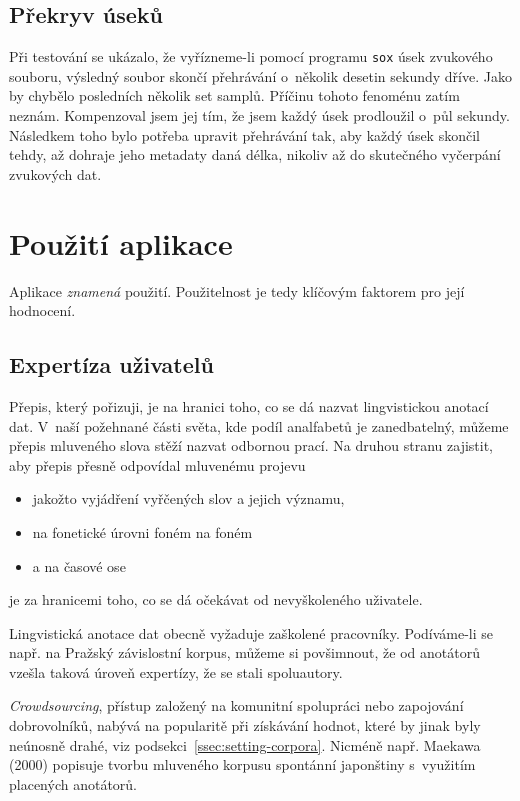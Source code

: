 \subsection{Překryv úseků}

Při testování se ukázalo, že vyřízneme-li pomocí programu \texttt{sox} úsek
zvukového souboru, výsledný soubor skončí přehrávání o~několik desetin sekundy
dříve. Jako by chybělo posledních několik set samplů. Příčinu tohoto fenoménu
zatím neznám. Kompenzoval jsem jej tím, že jsem každý úsek prodloužil o~půl
sekundy. Následkem toho bylo potřeba upravit přehrávání tak, aby každý úsek
skončil tehdy, až dohraje jeho metadaty daná délka, nikoliv až do skutečného
vyčerpání zvukových dat.


\section{Použití aplikace}

Aplikace {\em znamená} použití. Použitelnost je tedy klíčovým faktorem pro její hodnocení.

\subsection{Expertíza uživatelů}

Přepis, který pořizuji, je na hranici toho, co se dá nazvat lingvistickou
anotací dat. V~naší požehnané části světa, kde podíl analfabetů je zanedbatelný,
můžeme přepis mluveného slova stěží nazvat odbornou prací. Na druhou stranu zajistit, aby
přepis přesně odpovídal mluvenému projevu
\begin{itemize}
\item{jakožto vyjádření vyřčených slov a jejich významu,}
\item{na fonetické úrovni foném na foném}
\item{a na časové ose}
\end{itemize}
je za hranicemi toho, co se dá očekávat od nevyškoleného uživatele.

Lingvistická anotace dat obecně vyžaduje zaškolené pracovníky. Podíváme-li se
např. na Pražský závislostní korpus, můžeme si povšimnout, že od anotátorů
vzešla taková úroveň expertízy, že se stali spoluautory\cite{hajivc2005complex}.

{\em Crowdsourcing}, přístup založený na komunitní spolupráci nebo zapojování
dobrovolníků, nabývá na popularitě při získávání hodnot, které by jinak byly
neúnosně drahé, viz podsekci~\ref{ssec:setting-corpora}. Nicméně např.
Maekawa (2000)\cite{maekawa2000spontaneous} popisuje tvorbu
mluveného korpusu spontánní japonštiny s~využitím placených anotátorů.

